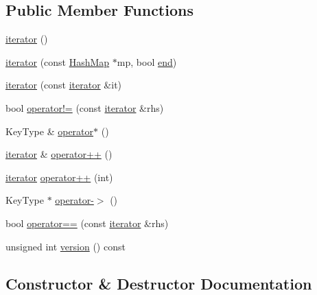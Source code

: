 \subsection*{Public Member Functions}
\begin{DoxyCompactItemize}
\item 
\mbox{\hyperlink{classHashMap_1_1iterator_a67d652c2433cf9217ed2a1485092fdd1}{iterator}} ()
\item 
\mbox{\hyperlink{classHashMap_1_1iterator_a1181555cedbd9186b537b54bc4e4fe53}{iterator}} (const \mbox{\hyperlink{classHashMap}{Hash\+Map}} $\ast$mp, bool \mbox{\hyperlink{classHashMap_a68b688a51bd0cf6fb5bc2cba292209a8}{end}})
\item 
\mbox{\hyperlink{classHashMap_1_1iterator_a698b7553261e7209d6c29fb55627dce4}{iterator}} (const \mbox{\hyperlink{classHashMap_1_1iterator}{iterator}} \&it)
\item 
bool \mbox{\hyperlink{classHashMap_1_1iterator_ae1983f2cb0df1f0cbe77ac29590e2e2b}{operator!=}} (const \mbox{\hyperlink{classHashMap_1_1iterator}{iterator}} \&rhs)
\item 
Key\+Type \& \mbox{\hyperlink{classHashMap_1_1iterator_a26107e2ced3252ee2bf81dd666739da7}{operator$\ast$}} ()
\item 
\mbox{\hyperlink{classHashMap_1_1iterator}{iterator}} \& \mbox{\hyperlink{classHashMap_1_1iterator_af1b1c7856a59f34c7d3570f946a2ff00}{operator++}} ()
\item 
\mbox{\hyperlink{classHashMap_1_1iterator}{iterator}} \mbox{\hyperlink{classHashMap_1_1iterator_a538d230f8b52d2bc0950e26ce74ec239}{operator++}} (int)
\item 
Key\+Type $\ast$ \mbox{\hyperlink{classHashMap_1_1iterator_a917c74872cce637554f68ebe3c666785}{operator-\/$>$}} ()
\item 
bool \mbox{\hyperlink{classHashMap_1_1iterator_a798956e7a65ef16c891d129b3ced0f9e}{operator==}} (const \mbox{\hyperlink{classHashMap_1_1iterator}{iterator}} \&rhs)
\item 
unsigned int \mbox{\hyperlink{classHashMap_1_1iterator_a0aa696ccb72cbf928535d6b646bac1aa}{version}} () const
\end{DoxyCompactItemize}


\subsection{Constructor \& Destructor Documentation}
\mbox{\label{classHashMap_1_1iterator_a67d652c2433cf9217ed2a1485092fdd1}} 
